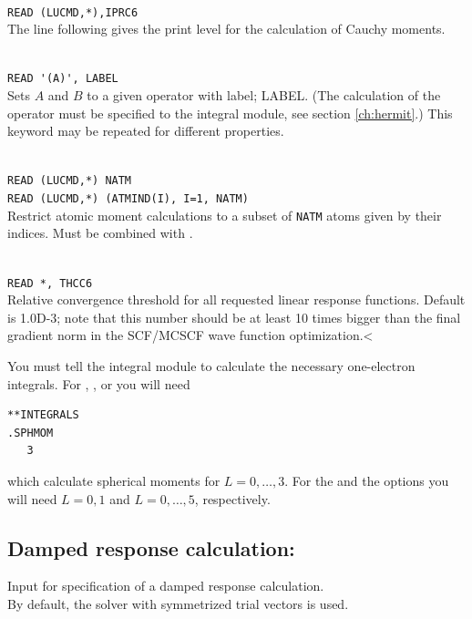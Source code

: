 \begin{description}
\item{}     \\
\verb|READ (LUCMD,*),IPRC6 |\\
   The line following gives the print level for the calculation of Cauchy moments.

\item{}\\
\verb|READ '(A)', LABEL|\\
Sets $A$ and $B$ to a given operator with label; LABEL.
(The calculation of the operator must be specified to the integral
module, see section \ref{ch:hermit}.)
This keyword may be repeated for different properties.

\item{}\\
\verb|READ (LUCMD,*) NATM|\\
\verb|READ (LUCMD,*) (ATMIND(I), I=1, NATM)|\\
Restrict atomic moment calculations to a subset of \verb|NATM| atoms given by their indices. Must be combined with .

\item{}\\
\verb|READ *, THCC6|\\
Relative convergence threshold for all requested linear response functions.
Default is 1.0D-3; note that this number should be at least 10 times
bigger than the final gradient norm in the SCF/MCSCF
wave function optimization.<
\end{description}



You must tell the integral module to calculate the necessary one-electron integrals.
For , , or  you will need

\begin{verbatim}
**INTEGRALS
.SPHMOM
   3
\end{verbatim}

which calculate spherical moments for $L = 0, \ldots, 3$.
For the  and the  options
you will need $L = 0, 1$ and $L = 0, \ldots, 5$, respectively.

\subsection{Damped response calculation: }
\label{sec:absorprsp}

Input for specification of a damped response
calculation.
\\
By default, the solver
with symmetrized trial vectors \cite{kauczor:2011} is used.

